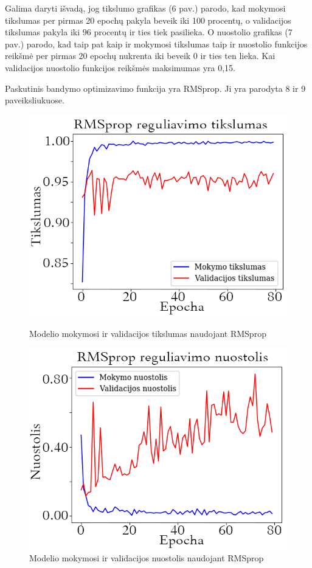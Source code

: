 \documentclass{VUMIFPSkursinis}
\begin{document}
Galima daryti išvadą, jog tikslumo grafikas (6 pav.) parodo, kad mokymosi tikslumas per pirmas 20 epochų pakyla beveik iki 100 procentų, o validacijos tikslumas pakyla iki 96 procentų ir ties tiek pasilieka.
O nuostolio grafikas (7 pav.) parodo, kad taip pat kaip ir mokymosi tikslumas taip ir nuostolio funkcijos reikšmė per pirmas 20 epochų nukrenta iki beveik 0 ir ties ten lieka. Kai validacijos nuostolio funkcijos reikšmės maksimumas yra 0,15.

Paskutinis bandymo optimizavimo funkcija yra RMSprop. Ji yra parodyta 8 ir 9 paveiksliukuose.

\begin{figure}[!htbp]
  \centering
  \begin{minipage}[b]{0.49\textwidth}
    \includegraphics[width=\textwidth]{img/FT/RMSprop_acc1.png}
    \caption{Modelio mokymosi ir validacijos tikslumas naudojant RMSprop}
  \end{minipage}
  \begin{minipage}[b]{0.49\textwidth}
    \includegraphics[width=\textwidth]{img/FT/RMSprop_loss1.png}
    \caption{Modelio mokymosi ir validacijos nuostolis naudojant RMSprop}
  \end{minipage}
\end{figure}
\end{document}
